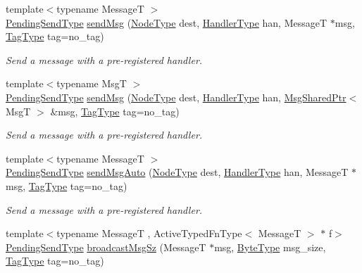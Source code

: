 \begin{DoxyCompactItemize}
{\footnotesize template$<$typename MessageT $>$ }\\\hyperlink{structvt_1_1messaging_1_1_active_messenger_a3626a6ca76d8ad4ec7c3b47a2c70d3a8}{Pending\+Send\+Type} \hyperlink{group__preregister_gaebfcd932babb3be0ea8d481f655a2835}{send\+Msg} (\hyperlink{namespacevt_a866da9d0efc19c0a1ce79e9e492f47e2}{Node\+Type} dest, \hyperlink{namespacevt_af64846b57dfcaf104da3ef6967917573}{Handler\+Type} han, MessageT $\ast$msg, \hyperlink{namespacevt_a84ab281dae04a52a4b243d6bf62d0e52}{Tag\+Type} tag=no\+\_\+tag)
\begin{DoxyCompactList}\small\item\em Send a message with a pre-\/registered handler. \end{DoxyCompactList}\item 
{\footnotesize template$<$typename MsgT $>$ }\\\hyperlink{structvt_1_1messaging_1_1_active_messenger_a3626a6ca76d8ad4ec7c3b47a2c70d3a8}{Pending\+Send\+Type} \hyperlink{group__preregister_ga16e324b8bb564227e5b396c4a10ec4bd}{send\+Msg} (\hyperlink{namespacevt_a866da9d0efc19c0a1ce79e9e492f47e2}{Node\+Type} dest, \hyperlink{namespacevt_af64846b57dfcaf104da3ef6967917573}{Handler\+Type} han, \hyperlink{structvt_1_1messaging_1_1_msg_shared_ptr}{Msg\+Shared\+Ptr}$<$ MsgT $>$ \&msg, \hyperlink{namespacevt_a84ab281dae04a52a4b243d6bf62d0e52}{Tag\+Type} tag=no\+\_\+tag)
\begin{DoxyCompactList}\small\item\em Send a message with a pre-\/registered handler. \end{DoxyCompactList}\item 
{\footnotesize template$<$typename MessageT $>$ }\\\hyperlink{structvt_1_1messaging_1_1_active_messenger_a3626a6ca76d8ad4ec7c3b47a2c70d3a8}{Pending\+Send\+Type} \hyperlink{group__preregister_ga0bae3a37f8fe6be59bac4e8e4b35aaba}{send\+Msg\+Auto} (\hyperlink{namespacevt_a866da9d0efc19c0a1ce79e9e492f47e2}{Node\+Type} dest, \hyperlink{namespacevt_af64846b57dfcaf104da3ef6967917573}{Handler\+Type} han, MessageT $\ast$msg, \hyperlink{namespacevt_a84ab281dae04a52a4b243d6bf62d0e52}{Tag\+Type} tag=no\+\_\+tag)
\begin{DoxyCompactList}\small\item\em Send a message with a pre-\/registered handler. \end{DoxyCompactList}\item 
{\footnotesize template$<$typename MessageT , Active\+Typed\+Fn\+Type$<$ Message\+T $>$ $\ast$ f$>$ }\\\hyperlink{structvt_1_1messaging_1_1_active_messenger_a3626a6ca76d8ad4ec7c3b47a2c70d3a8}{Pending\+Send\+Type} \hyperlink{group__typesafehan_gae119eb9b2ac7f1374c53ea957d7e4e2a}{broadcast\+Msg\+Sz} (MessageT $\ast$msg, \hyperlink{namespacevt_aab8d55968084610ce3b17057981e9300}{Byte\+Type} msg\+\_\+size, \hyperlink{namespacevt_a84ab281dae04a52a4b243d6bf62d0e52}{Tag\+Type} tag=no\+\_\+tag)

\end{DoxyCompactItemize}

